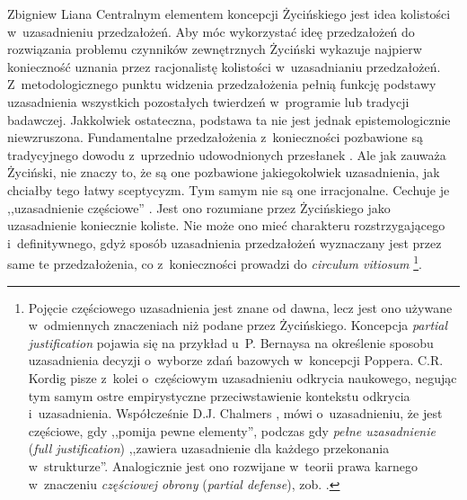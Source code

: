 \begin{artplenv}{Zbigniew Liana}
Centralnym elementem koncepcji Życińskiego jest idea kolistości w~uzasadnieniu przedzałożeń. Aby móc wykorzystać ideę przedzałożeń do rozwiązania problemu czynników zewnętrznych Życiński wykazuje najpierw konieczność uznania przez racjonalistę kolistości w~uzasadnianiu przedzałożeń. Z~metodologicznego punktu widzenia przedzałożenia pełnią funkcję podstawy uzasadnienia wszystkich pozostałych twierdzeń w~programie lub tradycji badawczej. Jakkolwiek ostateczna, podstawa ta nie jest jednak epistemologicznie niewzruszona. Fundamentalne przedzałożenia z~konieczności pozbawione są tradycyjnego dowodu z~uprzednio udowodnionych przesłanek
\parencite[][przypis 1]{zycinski_teizm_1985}. %
 Ale jak zauważa Życiński, nie znaczy to, że są one pozbawione jakiegokolwiek uzasadnienia, jak chciałby tego łatwy sceptycyzm. Tym samym nie są one irracjonalne. Cechuje je ,,uzasadnienie częściowe'' 
\parencite[][s.~7.156.161.169]{zycinski_teizm_1985}. %
 Jest ono rozumiane przez Życińskiego jako uzasadnienie koniecznie koliste. Nie może ono mieć charakteru rozstrzygającego i~definitywnego, gdyż sposób uzasadnienia przedzałożeń wyznaczany jest przez same te przedzałożenia, co z~konieczności prowadzi do \textit{circulum vitiosum} 
\parencite[][s.~173 oraz 129.141.164]{zycinski_teizm_1985}%
\footnote{Pojęcie częściowego uzasadnienia jest znane od dawna, lecz jest ono używane w~odmiennych znaczeniach niż podane przez Życińskiego. Koncepcja \textit{partial justification} pojawia się na przykład u~P. Bernaysa 
\parencite*[][s.~38]{bernays_reflections_1964} %
 na określenie sposobu uzasadnienia decyzji o~wyborze zdań bazowych w~koncepcji Poppera. C.R. Kordig 
\parencite*[][s.~112]{kordig_discovery_1978} %
 pisze z~kolei o~częściowym uzasadnieniu odkrycia naukowego, negując tym samym ostre empirystyczne przeciwstawienie kontekstu odkrycia i~uzasadnienia. Współcześnie D.J. Chalmers 
\parencite*[][s.~96]{chalmers_constructing_2012}, %
 mówi o~uzasadnieniu, że jest częściowe, gdy ,,pomija pewne elementy'', podczas gdy \textit{pełne uzasadnienie} (\textit{full justification}) ,,zawiera uzasadnienie dla każdego przekonania w~strukturze''. Analogicznie jest ono rozwijane w~teorii prawa karnego w~znaczeniu \textit{częściowej obrony} (\textit{partial defense}), zob. 
\parencite[][]{eldar_misguided_2014}.%
}.


\end{artplenv}
